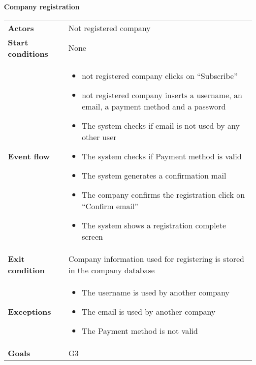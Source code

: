 \paragraph{Company registration}
\begin{center}
\begin{table}[H]
\centering
\begin{tabular}{l|l}
\textbf{Actors} & Not registered company \\
\textbf{Start conditions} & None \\


\textbf{Event flow}  & \begin{minipage}[t]{0.7\textwidth}
    \begin{itemize}
        \item not registered company clicks on “Subscribe”
\item not registered company inserts a username, an email, a payment method and a password
\item The system checks if email is not used by any other user
\item The system checks if Payment method is valid
\item The system generates a confirmation mail
\item The company confirms the registration click on “Confirm email”
\item The system shows a registration complete screen
    \end{itemize}
    
\end{minipage}\\ 

\textbf{Exit condition} & Company information used for registering is stored in the company database \\
\textbf{Exceptions} & \begin{minipage}[t]{0.7\textwidth}
    \begin{itemize}
        \item The username is used by another company
\item The email is used by another company
\item The Payment method is not valid

    \end{itemize}
    
\end{minipage}\\
\textbf{Goals} & G3 
\end{tabular}

\end{table}
\end{center}



